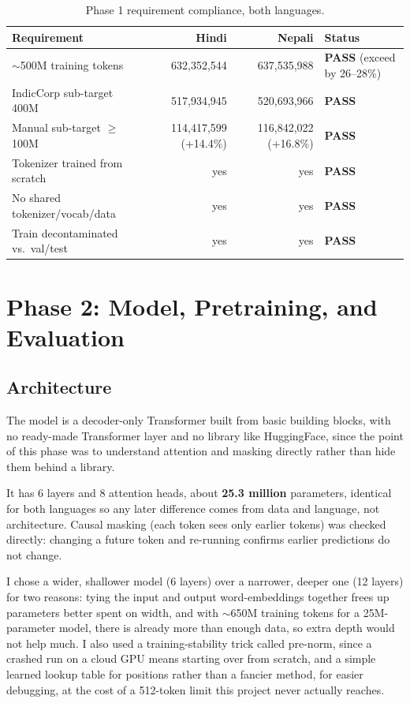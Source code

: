 \documentclass[11pt]{article}
\begin{document}
\begin{table}[h]
\centering\small
\begin{tabular}{lrrl}
\toprule
\textbf{Requirement} & \textbf{Hindi} & \textbf{Nepali} & \textbf{Status} \\
\midrule
$\sim$500M training tokens & 632,352,544 & 637,535,988 & \textbf{PASS} (exceed by 26--28\%) \\
IndicCorp sub-target 400M & 517,934,945 & 520,693,966 & \textbf{PASS} \\
Manual sub-target $\geq$100M & 114,417,599 (+14.4\%) & 116,842,022 (+16.8\%) & \textbf{PASS} \\
Tokenizer trained from scratch & yes & yes & \textbf{PASS} \\
No shared tokenizer/vocab/data & yes & yes & \textbf{PASS} \\
Train decontaminated vs.\ val/test & yes & yes & \textbf{PASS} \\
\bottomrule
\end{tabular}
\caption{Phase 1 requirement compliance, both languages.}
\end{table}

\section{Phase 2: Model, Pretraining, and Evaluation}

\subsection{Architecture}

{\sloppy The model is a decoder-only Transformer built from basic building blocks, with no ready-made Transformer layer and no library like HuggingFace, since the point of this phase was to understand attention and masking directly rather than hide them behind a library.\par} It has 6 layers and 8 attention heads, about \textbf{25.3 million} parameters, identical for both languages so any later difference comes from data and language, not architecture. Causal masking (each token sees only earlier tokens) was checked directly: changing a future token and re-running confirms earlier predictions do not change.

I chose a wider, shallower model (6 layers) over a narrower, deeper one (12 layers) for two reasons: tying the input and output word-embeddings together frees up parameters better spent on width, and with $\sim$650M training tokens for a 25M-parameter model, there is already more than enough data, so extra depth would not help much. I also used a training-stability trick called pre-norm, since a crashed run on a cloud GPU means starting over from scratch, and a simple learned lookup table for positions rather than a fancier method, for easier debugging, at the cost of a 512-token limit this project never actually reaches.
\end{document}
